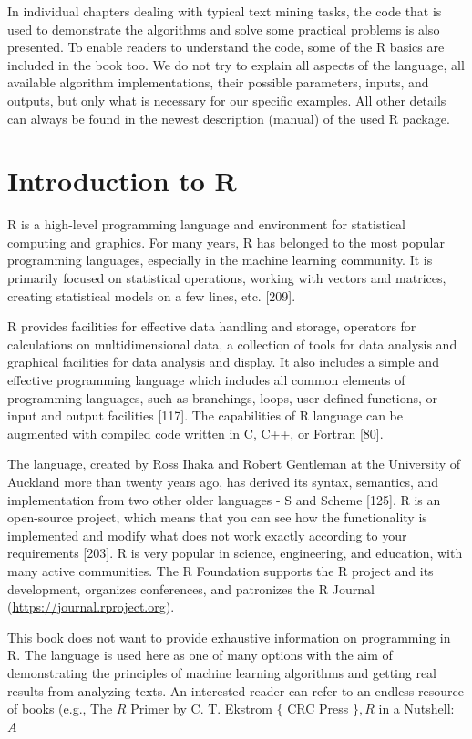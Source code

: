 \documentclass[11pt,openany,executivepaper]{book}
\begin{document}
In individual chapters dealing with typical text mining tasks, the code that is used to demonstrate the algorithms and solve some practical problems is also presented. To enable readers to understand the code, some of the R basics are included in the book too. We do not try to explain all aspects of the language, all available algorithm implementations, their possible parameters, inputs, and outputs, but only what is necessary for our specific examples. All other details can always be found in the newest description (manual) of the used R package.

\chapter{Introduction to R}
R is a high-level programming language and environment for statistical computing and graphics. For many years, R has belonged to the most popular programming languages, especially in the machine learning community. It is primarily focused on statistical operations, working with vectors and matrices, creating statistical models on a few lines, etc. [209].

R provides facilities for effective data handling and storage, operators for calculations on multidimensional data, a collection of tools for data analysis and graphical facilities for data analysis and display. It also includes a simple and effective programming language which includes all common elements of programming languages, such as branchings, loops, user-defined functions, or input and output facilities [117]. The capabilities of R language can be augmented with compiled code written in C, C++, or Fortran [80].

The language, created by Ross Ihaka and Robert Gentleman at the University of Auckland more than twenty years ago, has derived its syntax, semantics, and implementation from two other older languages - S and Scheme [125]. R is an open-source project, which means that you can see how the functionality is implemented and modify what does not work exactly according to your requirements [203]. R is very popular in science, engineering, and education, with many active communities. The R Foundation supports the R project and its development, organizes conferences, and patronizes the R Journal (\href{https://journal.rproject.org}{https://journal.rproject.org}).

This book does not want to provide exhaustive information on programming in R. The language is used here as one of many options with the aim of demonstrating the principles of machine learning algorithms and getting real results from analyzing texts. An interested reader can refer to an endless resource of books (e.g., The $R$ Primer by C. T. Ekstrom $\{$ CRC Press $\}, R$ in a Nutshell: $A$
\end{document}
